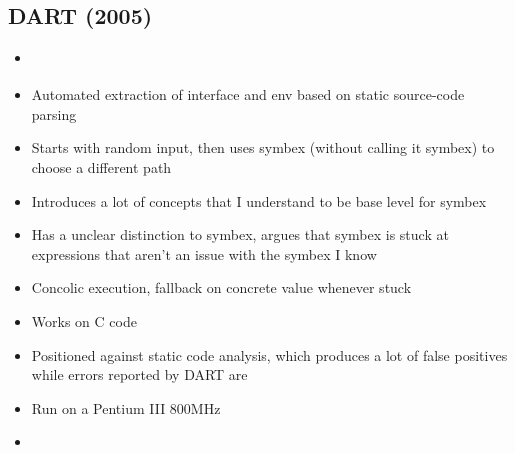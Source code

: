 \documentclass{article}
\begin{document}
\subsection{DART (2005)}
\begin{itemize}
  \item \cite{DART}
  \item Automated extraction of interface and env based on static source-code parsing
  \item Starts with random input, then uses symbex (without calling it symbex) to choose a different path
  \item Introduces a lot of concepts that I understand to be base level for symbex
  \item Has a unclear distinction to symbex, argues that symbex is stuck at expressions that aren't an issue with the symbex I know
  \item Concolic execution, fallback on concrete value whenever stuck
  \item Works on C code
  \item Positioned against static code analysis, which produces a lot of false positives while errors reported by DART are \cite{DART}
  \item Run on a Pentium III 800MHz
  \item {}\cite{DART}
\end{itemize}
\end{document}
